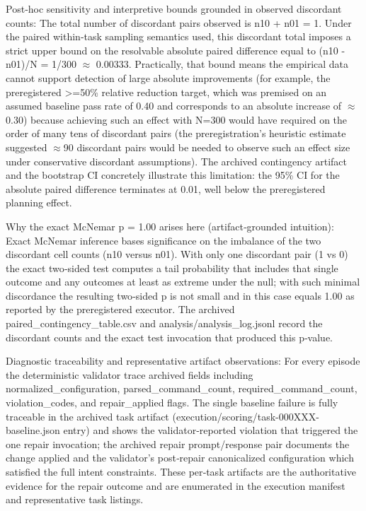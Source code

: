\documentclass[conference]{IEEEtran}
\begin{document}
Post‑hoc sensitivity and interpretive bounds grounded in observed discordant counts: The total number of discordant pairs observed is n10 + n01 = 1. Under the paired within‑task sampling semantics used, this discordant total imposes a strict upper bound on the resolvable absolute paired difference equal to (n10 - n01)/N = 1/300 \ensuremath{\approx} 0.00333. Practically, that bound means the empirical data cannot support detection of large absolute improvements (for example, the preregistered >=50\% relative reduction target, which was premised on an assumed baseline pass rate of 0.40 and corresponds to an absolute increase of \ensuremath{\approx}0.30) because achieving such an effect with N=300 would have required on the order of many tens of discordant pairs (the preregistration's heuristic estimate suggested \ensuremath{\approx}90 discordant pairs would be needed to observe such an effect size under conservative discordant assumptions). The archived contingency artifact and the bootstrap CI concretely illustrate this limitation: the 95\% CI for the absolute paired difference terminates at 0.01, well below the preregistered planning effect.

Why the exact McNemar p = 1.00 arises here (artifact‑grounded intuition): Exact McNemar inference bases significance on the imbalance of the two discordant cell counts (n10 versus n01). With only one discordant pair (1 vs 0) the exact two‑sided test computes a tail probability that includes that single outcome and any outcomes at least as extreme under the null; with such minimal discordance the resulting two‑sided p is not small and in this case equals 1.00 as reported by the preregistered executor. The archived paired\_contingency\_table.csv and analysis/analysis\_log.jsonl record the discordant counts and the exact test invocation that produced this p‑value.

Diagnostic traceability and representative artifact observations: For every episode the deterministic validator trace archived fields including normalized\_configuration, parsed\_command\_count, required\_command\_count, violation\_codes, and repair\_applied flags. The single baseline failure is fully traceable in the archived task artifact (execution/scoring/task-000XXX-baseline.json entry) and shows the validator‑reported violation that triggered the one repair invocation; the archived repair prompt/response pair documents the change applied and the validator's post‑repair canonicalized configuration which satisfied the full intent constraints. These per‑task artifacts are the authoritative evidence for the repair outcome and are enumerated in the execution manifest and representative task listings.
\end{document}
